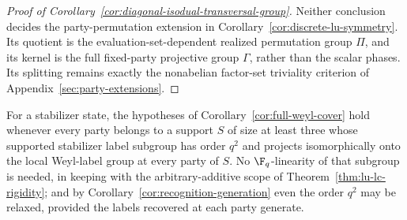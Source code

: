 \begin{proof}[Proof of
Corollary~\ref{cor:diagonal-isodual-transversal-group}]
Neither conclusion decides the party-permutation extension in
Corollary~\ref{cor:discrete-lu-symmetry}.  Its quotient is the
evaluation-set-dependent realized permutation group \(\Pi\), and its
kernel is the full fixed-party projective group \(\Gamma\), rather than
the scalar phases.  Its splitting remains exactly the nonabelian
factor-set triviality criterion of Appendix~\ref{sec:party-extensions}.
\end{proof}

For a stabilizer state, the hypotheses of
Corollary~\ref{cor:full-weyl-cover} hold whenever every party belongs to
a support \(S\) of size at least three whose supported stabilizer label
subgroup has order \(q^2\) and projects isomorphically onto the local
Weyl-label group at every party of \(S\).  No \(\F_q\)-linearity of that
subgroup is needed, in keeping with the arbitrary-additive scope of
Theorem~\ref{thm:lu-lc-rigidity}; and by
Corollary~\ref{cor:recognition-generation} even the order \(q^2\) may be
relaxed, provided the labels recovered at each party generate.
